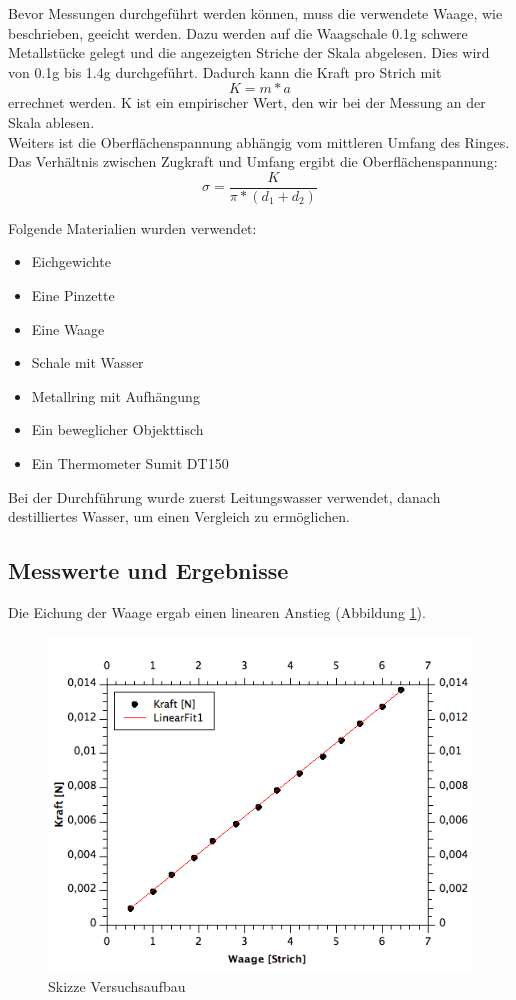 \documentclass[12pt,a4paper]{article}
\begin{document}
\begin{multicols}{2}
\noindent
Bevor Messungen durchgeführt werden können, muss die verwendete Waage, wie beschrieben, geeicht werden. Dazu werden auf die Waagschale 0.1g schwere Metallstücke gelegt und die angezeigten Striche der Skala abgelesen. Dies wird von 0.1g bis 1.4g durchgeführt. Dadurch kann die Kraft pro Strich mit
$$K = m * a$$
errechnet werden. K ist ein empirischer Wert, den wir bei der Messung an der Skala ablesen.\\
Weiters ist die Oberflächenspannung abhängig vom mittleren Umfang des Ringes. Das Verhältnis zwischen Zugkraft und Umfang ergibt die Oberflächenspannung:
$$\sigma = \frac{K}{\pi * (d_1 + d_2)}$$

\noindent
Folgende Materialien wurden verwendet:
\begin{itemize}
	\item Eichgewichte
	\item Eine Pinzette
	\item Eine Waage
	\item Schale mit Wasser
	\item Metallring mit Aufhängung
	\item Ein beweglicher Objekttisch
	\item Ein Thermometer Sumit DT150
\end{itemize}

\noindent Bei der Durchführung wurde zuerst Leitungswasser verwendet, danach destilliertes Wasser, um einen Vergleich zu ermöglichen.

\subsection{Messwerte und Ergebnisse}
Die Eichung der Waage ergab einen linearen Anstieg (Abbildung \ref{fig:oberflaeche_eichung_fit}). 

\begin{figure}[H]
	\centering
	\includegraphics[scale=0.45]{./figure/Waageneichung-Fit_02.png}
	\caption{Skizze Versuchsaufbau}
	\label{fig:oberflaeche_eichung_fit}
\end{figure}



\end{multicols}
\end{document}
